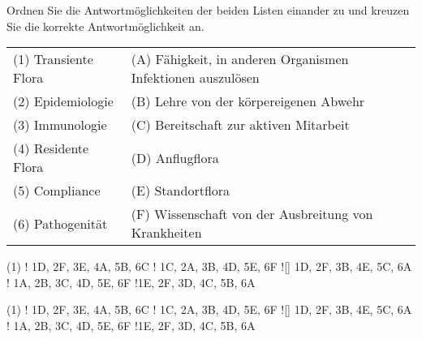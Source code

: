 \documentclass[a4paper]{scrartcl}
\begin{document}
\begin{aufgabe}{2}
	Ordnen Sie die Antwortmöglichkeiten der beiden Listen einander zu und kreuzen Sie die korrekte Antwortmöglichkeit an.
	
	\vspace{1em}
	\begin{tabular}{ll}
		(1) Transiente Flora & (A) Fähigkeit, in anderen Organismen Infektionen auszulösen\\
		(2) Epidemiologie & (B) Lehre von der körpereigenen Abwehr\\
		(3) Immunologie & (C) Bereitschaft zur aktiven Mitarbeit\\
		(4) Residente Flora & (D) Anflugflora\\
		(5) Compliance & (E) Standortflora\\
		(6) Pathogenität & (F) Wissenschaft von der Ausbreitung von Krankheiten\\
	\end{tabular}
	
	
	\begin{mcumgebung}(1)
		\choice! 1D, 2F, 3E, 4A, 5B, 6C
		\choice! 1C, 2A, 3B, 4D, 5E, 6F
		\choice![\mcrichtig] 1D, 2F, 3B, 4E, 5C, 6A
		\choice! 1A, 2B, 3C, 4D, 5E, 6F
		\choice!1E, 2F, 3D, 4C, 5B, 6A
	\end{mcumgebung}
	
	\begin{loesung}
		\begin{mcumgebung}(1)
		\choice! 1D, 2F, 3E, 4A, 5B, 6C
		\choice! 1C, 2A, 3B, 4D, 5E, 6F
		\choice![\mcrichtig] 1D, 2F, 3B, 4E, 5C, 6A
		\choice! 1A, 2B, 3C, 4D, 5E, 6F
		\choice!1E, 2F, 3D, 4C, 5B, 6A
		\end{mcumgebung}
	\end{loesung}
\end{aufgabe}
\end{document}
